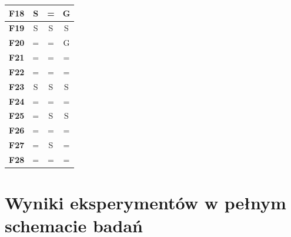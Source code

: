 \documentclass[12pt,a4paper]{report}
\begin{document}
{{{{{{{\begin{table}[]
\begin{tabular}{|l|c|c|c|}
{\bf F18}                     & S        & =         & G         \\ \hline
{\bf F19}                     & S        & S         & S         \\ \hline
{\bf F20}                     & =        & =         & G         \\ \hline
{\bf F21}                     & =        & =         & =         \\ \hline
{\bf F22}                     & =        & =         & =         \\ \hline
{\bf F23}                     & S        & S         & S         \\ \hline
{\bf F24}                     & =        & =         & =         \\ \hline
{\bf F25}                     & =        & S         & S         \\ \hline
{\bf F26}                     & =        & =         & =         \\ \hline
{\bf F27}                     & =        & S         & =         \\ \hline
{\bf F28}                     & =        & =         & =         \\ \hline
\end{tabular}
\end{table}



\chapter{Wyniki eksperymentów w pełnym schemacie badań}

}}}}}}}
\end{document}
